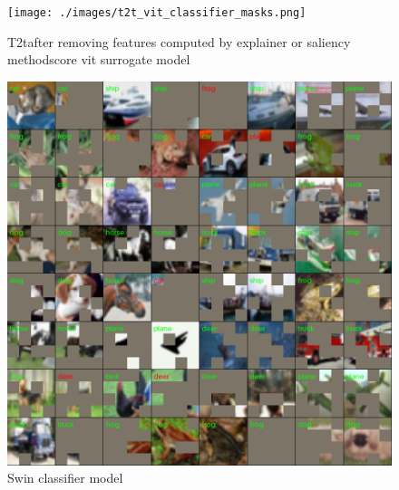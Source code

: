 \documentclass[magisterska,en]{pracamgr}
\begin{document}
\begin{figure}[H]
\centering
\texttt{[image: ./images/t2t\_vit\_classifier\_masks.png]}
\caption{T2t\textdel after removing features computed by explainer or saliency methodscore vit surrogate model}
\label{t2t_vit_classifier_masks}
\end{figure}


\begin{figure}[H]
\centering
\includegraphics[scale=0.5]{./images/swin_classifier_masks.png}
\caption{Swin classifier model}
\label{swin_classifier_masks}
\end{figure}




\fi


















\printbibliography
\end{document}
